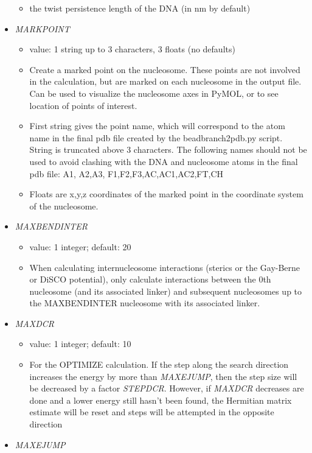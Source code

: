 \documentclass[12pt,dvips]{article}
\begin{document}
\begin{itemize}
\begin{itemize}
    \item the twist persistence length of the DNA (in nm by default)
  \end{itemize}
%
\item {\it MARKPOINT}
  \begin{itemize}
    \item value: 1 string up to 3 characters, 3 floats (no defaults)
    \item Create a marked point on the nucleosome. These points are not involved in the calculation, but are marked on each nucleosome in the output file. Can be used to visualize the nucleosome axes in PyMOL, or to see location of points of interest.
    \item First string gives the point name, which will correspond to the atom name in the final pdb file created by the beadbranch2pdb.py script. String is truncated above 3 characters. The following names should not be used to avoid clashing with the DNA and nucleosome atoms in the final pdb file: A1, A2,A3, F1,F2,F3,AC,AC1,AC2,FT,CH
    \item Floats are x,y,z coordinates of the marked point in the coordinate system of the nucleosome.
  \end{itemize}
%
\item {\it MAXBENDINTER}
  \begin{itemize}
    \item value: 1 integer; default: 20
    \item When calculating internucleosome interactions (sterics or the Gay-Berne or DiSCO potential), only calculate interactions between the 0th nucleosome (and its associated linker) and subsequent nucleosomes up to the MAXBENDINTER nucleosome with its associated linker.
  \end{itemize}
%
\item {\it MAXDCR}
  \begin{itemize}
    \item value: 1 integer; default: 10
    \item For the OPTIMIZE calculation. If the step along the search direction increases the energy by more than {\em MAXEJUMP}, then the step size will be decreased by a factor {\em STEPDCR}. However, if {\em MAXDCR} decreases are done and a lower energy still hasn't been found, the Hermitian matrix estimate will be reset and steps will be attempted in the opposite direction
  \end{itemize}
%
\item {\it MAXEJUMP}
  \begin{itemize}

\end{itemize}
\end{itemize}
\end{document}
